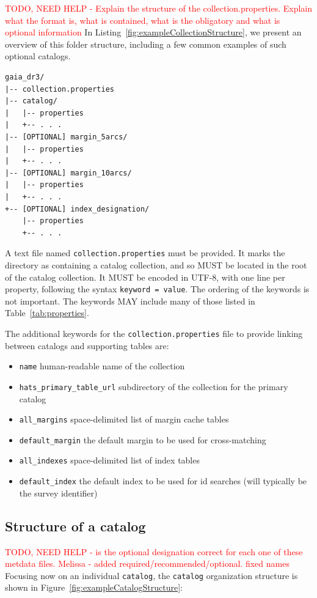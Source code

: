\documentclass[11pt,a4paper]{ivoa}
\begin{document}
\textcolor{red}{TODO, NEED HELP -  Explain the structure of the collection.properties. Explain what the format is, what is contained, what is the obligatory and what is optional information}
In Listing~\ref{fig:exampleCollectionStructure}, we present an overview of this folder structure, including a few common examples of such optional catalogs.

\begin{minipage}{\linewidth}
\begin{lstlisting}[caption=Example collection directory contents, label=fig:exampleCollectionStructure]
gaia_dr3/
|-- collection.properties
|-- catalog/
|   |-- properties
|   +-- . . .
|-- [OPTIONAL] margin_5arcs/
|   |-- properties
|   +-- . . .
|-- [OPTIONAL] margin_10arcs/
|   |-- properties
|   +-- . . .
+-- [OPTIONAL] index_designation/
    |-- properties
    +-- . . .
\end{lstlisting}
\end{minipage}

A text file named \texttt{collection.properties} must be provided. 
It marks the directory as containing a catalog collection, and so MUST be located in the 
root of the catalog collection.
It MUST be encoded in UTF-8, with one line per property, following the syntax \texttt{keyword = value}.
The ordering of the keywords is not important. The keywords MAY include many of those listed in Table~\ref{tab:properties}.

The additional keywords for the \texttt{collection.properties} file to provide linking between catalogs and supporting tables are:

\begin{itemize}
    \item \texttt{name} human-readable name of the collection
    \item \texttt{hats\_primary\_table\_url} subdirectory of the collection for the primary catalog
    \item \texttt{all\_margins} space-delimited list of margin cache tables
    \item \texttt{default\_margin} the default margin to be used for cross-matching
    \item \texttt{all\_indexes} space-delimited list of index tables
    \item \texttt{default\_index} the default index to be used for id searches (will typically be the survey identifier)
\end{itemize}
    

\subsection{Structure of a catalog} \label{sec:catalog}
\textcolor{red}{TODO, NEED HELP - is the optional designation correct for each one of these metdata files. Melissa - added required/recommended/optional. fixed names} 
Focusing now on an individual  \texttt{catalog}, the  \texttt{catalog} organization structure is shown in Figure~\ref{fig:exampleCatalogStructure}:
\end{document}
